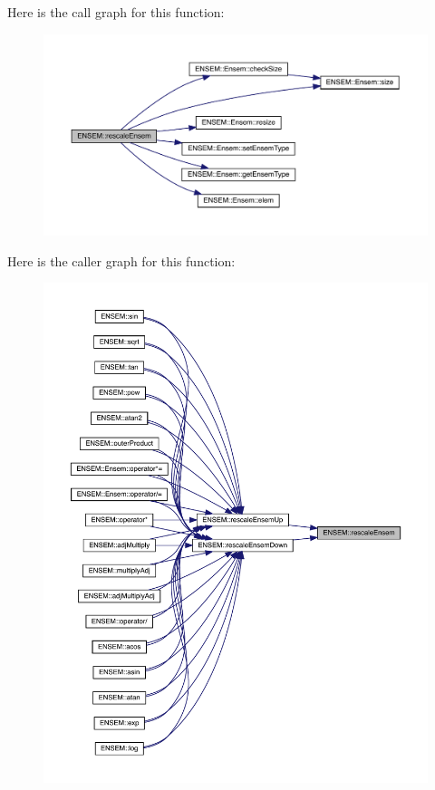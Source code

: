 Here is the call graph for this function\+:\nopagebreak
\begin{figure}[H]
\begin{center}
\leavevmode
\includegraphics[width=350pt]{d1/d9e/group__eensem_gadbb88f64cff72d8d368551b6de6753f9_cgraph}
\end{center}
\end{figure}
Here is the caller graph for this function\+:\nopagebreak
\begin{figure}[H]
\begin{center}
\leavevmode
\includegraphics[width=350pt]{d1/d9e/group__eensem_gadbb88f64cff72d8d368551b6de6753f9_icgraph}
\end{center}
\end{figure}
\mbox{\label{group__eensem_gae1ec6cc73aa72bf1f07360fa333487fe}} 

